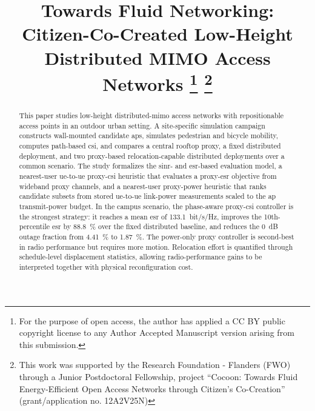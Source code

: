\documentclass[conference]{IEEEtran}
\begin{document}
\title{Towards Fluid Networking: Citizen-Co-Created Low-Height Distributed MIMO Access Networks%
\thanks{For the purpose of open access, the author has applied a CC BY public copyright license to any Author Accepted Manuscript version arising from this submission.}%
\thanks{This work was supported by the Research Foundation - Flanders (FWO) through a Junior Postdoctoral Fellowship, project “Cocoon: Towards Fluid Energy-Efficient Open Access Networks through Citizen’s Co-Creation” (grant/application no. 12A2V25N)}
}

\author{
}

\maketitle

\begin{abstract}
This paper studies low-height distributed-\gls{mimo} access networks with repositionable access points in an outdoor urban setting. A site-specific simulation campaign constructs wall-mounted candidate \glspl{ap}, simulates pedestrian and bicycle mobility, computes path-based \gls{csi}, and compares a central rooftop proxy, a fixed distributed deployment, and two proxy-based relocation-capable distributed deployments over a common scenario. The study formalizes the \gls{sinr}- and \gls{esr}-based evaluation model, a nearest-user \gls{ue}-to-\gls{ue} proxy-\gls{csi} heuristic that evaluates a proxy-\gls{esr} objective from wideband proxy channels, and a nearest-user proxy-power heuristic that ranks candidate subsets from stored \gls{ue}-to-\gls{ue} link-power measurements scaled to the \gls{ap} transmit-power budget. In the campus scenario, the phase-aware proxy-\gls{csi} controller is the strongest strategy: it reaches a mean \gls{esr} of \SI{133.1}{bit/s/Hz}, improves the \num{10}th-percentile \gls{esr} by \SI{88.8}{\percent} over the fixed distributed baseline, and reduces the \SI{0}{dB} outage fraction from \SI{4.41}{\percent} to \SI{1.87}{\percent}. The power-only proxy controller is second-best in radio performance but requires more motion. Relocation effort is quantified through schedule-level displacement statistics, allowing radio-performance gains to be interpreted together with physical reconfiguration cost.
\end{abstract}
\end{document}
